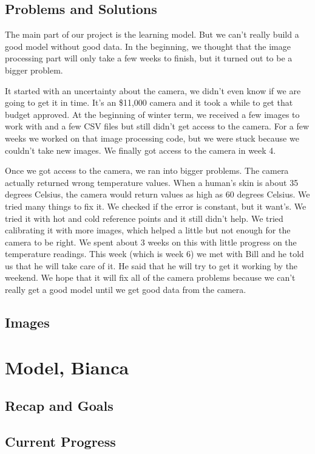 \documentclass[onecolumn, draftclsnofoot,10pt, compsoc]{IEEEtran}
\begin{document}
\subsection{Problems and Solutions}
The main part of our project is the learning model. But we can’t really build a good model without good data. In the beginning, we thought that the image processing part will only take a few weeks to finish, but it turned out to be a bigger problem. 


It started with an uncertainty about the camera, we didn’t even know if we are going to get it in time. It’s an \$11,000 camera and it took a while to get that budget approved. At the beginning of winter term, we received a few images to work with and a few CSV files but still didn’t get access to the camera. For a few weeks we worked on that image processing code, but we were stuck because we couldn’t take new images. We finally got access to the camera in week 4. 

Once we got access to the camera, we ran into bigger problems. The camera actually returned wrong temperature values. When a human’s skin is about 35 degrees Celsius, the camera would return values as high as 60 degrees Celsius.  We tried many things to fix it. We checked if the error is constant, but it want’s.  We tried it with hot and cold reference points and it still didn’t help. We tried calibrating it with more images, which helped a little but not enough for the camera to be right. We spent about 3 weeks on this with little progress on the temperature readings. This week (which is week 6) we met with Bill and he told us that he will take care of it. He said that he will try to get it working by the weekend. We hope that it will fix all of the camera problems because we can’t really get a good model until we get good data from the camera.\cite{ClaudeTech}

\subsection{Images}

\section{Model, Bianca}

\subsection{Recap and Goals}


\subsection{Current Progress}
\end{document}
